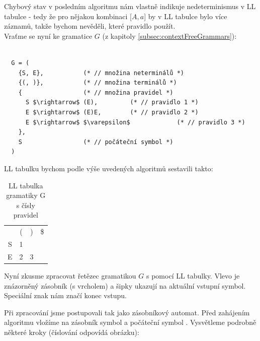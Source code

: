 Chybový stav v posledním algoritmu nám vlastně indikuje nedeterminismus
v LL tabulce - tedy že pro nějakou kombinaci [$A, a$] by v LL tabulce bylo
více záznamů, takže bychom nevěděli, které pravidlo použít.\\

\noindent
Vraťme se nyní ke gramatice $G$ (z kapitoly \ref{subsec:contextFreeGrammars}):
\begin{exmp}

\begin{lstlisting}

  G = (
    {S, E},           (* // množina neterminálů *)
    {(, )},           (* // množina terminálů *)
    {                 (* // množina pravidel *)
      S $\rightarrow$ (E),         (* // pravidlo 1 *)
      E $\rightarrow$ (E)E,        (* // pravidlo 2 *)
      E $\rightarrow$ $\varepsilon$             (* // pravidlo 3 *)
    },
    S                 (* // počáteční symbol *)
  )
\end{lstlisting}
\noindent
LL tabulku bychom podle výše uvedených algoritmů sestavili takto:
\begin{table}[H]
  \centering
  \begin{tabular}{| c || c | c | c |}
    \hline
      & ( & ) & \$ \\
    \hhline{|=||=|=|=|}
    S & 1 &   &    \\
    \hline
    E & 2 & 3 &    \\
    \hline
  \end{tabular}
  \caption{LL tabulka gramatiky G s čísly pravidel}
\end{table}


Nyní zkusme zpracovat řetězec \symb{(())} gramatikou $G$
s pomocí LL tabulky.
Vlevo je znázorněný zásobník (s vrcholem)
a šipky ukazují na aktuální vstupní symbol.
Speciální znak \symb{\$} nám značí konec vstupu.

\begin{figure}[H]
  \centering
\end{figure}

Při zpracování jsme postupovali tak jako zásobníkový automat.
Před zahájením algoritmu vložíme na zásobník symbol \symb{\$}
a počáteční symbol . Vysvětleme podrobně některé kroky (číslování odpovídá obrázku):


\end{exmp}
